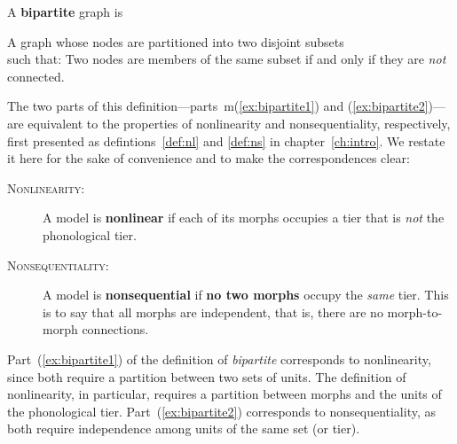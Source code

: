 \begin{exe} 
	\ex \label{ex:bipartite} A \textbf{bipartite} graph is  
	\begin{xlist} 
		\ex \label{ex:bipartite1}%
	 	A graph whose nodes are partitioned into two disjoint subsets \\ such that: %
		\ex \label{ex:bipartite2}%
		Two nodes are members of the same subset if and only if 
		they are \emph{not} connected.
	\end{xlist}
\end{exe}
The two parts of this definition---parts~m(\ref{ex:bipartite1}) and (\ref{ex:bipartite2})---are equivalent to the properties of nonlinearity and 
nonsequentiality, respectively, first presented as defintions~\ref{def:nl} and \ref{def:ns} in chapter~\ref{ch:intro}. We restate it here for the sake of convenience and to make the correspondences clear:
	\begin{description}
	\item[\textsc{Nonlinearity:}]
	A model is \textbf{nonlinear} if each of its morphs occupies a tier that is \emph{not} the phonological tier.
	\item[\textsc{Nonsequentiality:}]
	A model is \textbf{nonsequential} if \textbf{no two morphs} occupy the \emph{same} tier. This is to say that all morphs are independent, that is, there are no morph-to-morph connections.
	\end{description}
Part~(\ref{ex:bipartite1}) of the definition of \emph{bipartite} corresponds to nonlinearity, since both require a partition between two sets of units. The definition of nonlinearity, in particular, requires a partition between morphs and the units of the phonological tier. 
Part~(\ref{ex:bipartite2}) corresponds to nonsequentiality, as both require independence among units of the same set (or tier).

